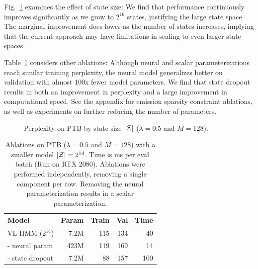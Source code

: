 \documentclass[11pt,a4paper]{article}
\begin{document}
Fig.~\ref{tbl:states-ablation} examines the effect of state size:
We find that performance continuously improves significantly as we grow to $2^{16}$ states, justifying the large state space.
The marginal improvement does lower as the number of states increases, implying that the current approach may have limitations in scaling to even larger state spaces.

Table~\ref{tbl:dropout-param-ablation} considers other ablations:
Although neural and scalar parameterizations reach similar training perplexity,
the neural model generalizes better on validation
with almost 100x fewer model parameters.
We find that state dropout results in both an improvement in perplexity and
a large improvement in computational speed.
See the appendix for emission sparsity constraint ablations,
as well as experiments on further reducing the number of parameters.

\begin{figure}[!t]
\centering
{}
\caption{\label{tbl:states-ablation}
Perplexity on \textsc{PTB} by state size $|\mathcal{Z}|$ ($\lambda =0.5$ and $M=128$).
}
\end{figure}


\begin{table}[!t]
\centering
\begin{tabular}{lrrrr}
\toprule
Model                & Param & Train  & Val  &  Time \\
\midrule
VL-HMM ($2^{14}$)    & 7.2M & 115    & 134  & 40\\
\quad - neural param & 423M & 119    & 169  & 14\\
\quad - state dropout      & 7.2M & 88     & 157  & 100\\
\bottomrule
\end{tabular}
\caption{\label{tbl:dropout-param-ablation}
Ablations on \textsc{PTB} ($\lambda =0.5$ and $M=128$) with a smaller model $|\mathcal{Z}| = 2^{14}$. 
Time is ms per eval batch (Run on RTX 2080).
Ablations were performed independently, removing a single component per row. Removing the neural parameterization results in a scalar parameterization.
} 
\end{table}
\end{document}
